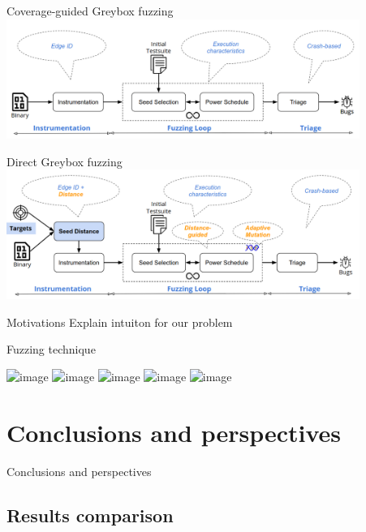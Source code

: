 \documentclass{beamer}
\begin{document}
\begin{frame}{Coverage-guided Greybox fuzzing}
\includegraphics[width=11.5cm]{Figures/Fuzzing/graph2.png}
\end{frame}

\begin{frame}{Direct Greybox fuzzing}
\includegraphics[width=11.5cm]{Figures/Fuzzing/graph3.png}
\end{frame}

\begin{frame}{Motivations}
Explain intuiton for our problem
\end{frame}

\begin{frame}{Fuzzing technique}

\includegraphics<1>[scale=0.3]{Figures/Fuzzing/1.png}
\includegraphics<2>[scale=0.3]{Figures/Fuzzing/2.png}
\includegraphics<3>[scale=0.3]{Figures/Fuzzing/3.png}
\includegraphics<4>[scale=0.3]{Figures/Fuzzing/4.png}
\includegraphics<5>[scale=0.3]{Figures/Fuzzing/5.png}

\end{frame}


\section{Conclusions and perspectives}

\begin{frame}
\centering
\LARGE Conclusions and perspectives
\end{frame}

\subsection{Results comparison}
\end{document}
